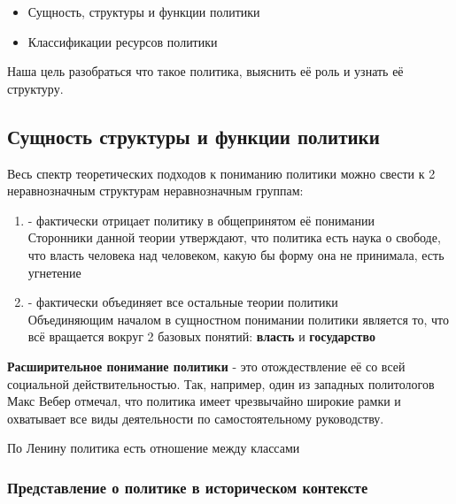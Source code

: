 \begin{itemize}
      \item Сущность, структуры и функции политики
      \item Классификации ресурсов политики
\end{itemize}

Наша цель разобраться что такое политика, выяснить её роль и узнать её структуру.

\subsection{Сущность структуры и функции политики}

Весь спектр теоретических подходов к пониманию политики можно свести к 2 неравнозначным
структурам неравнозначным группам:

\begin{enumerate}
      \item {} - фактически отрицает политику в
            общепринятом её понимании \\
            Сторонники данной теории утверждают, что политика есть наука о свободе, что
            власть человека над человеком, какую бы форму она не принимала, есть
            угнетение

      \item {} - фактически объединяет все остальные теории
            политики \\
            Объединяющим началом в сущностном понимании политики является то, что всё
            вращается вокруг 2 базовых понятий: \textbf{власть} и \textbf{государство}
\end{enumerate}

\textbf{Расширительное понимание политики} - это отождествление её со всей социальной
действительностью. Так, например, один из западных политологов Макс Вебер отмечал, что
политика имеет чрезвычайно широкие рамки и охватывает все виды деятельности по
самостоятельному руководству.

По Ленину политика есть отношение между классами

\subsubsection{Представление о политике в историческом контексте}

